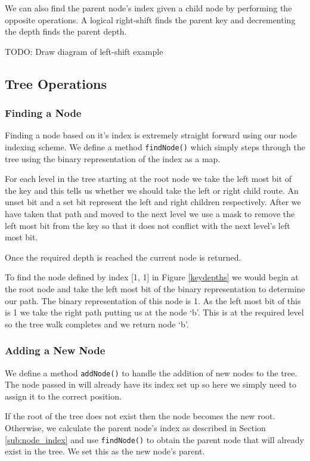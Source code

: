 \documentclass{report}
\begin{document}
We can also find the parent node's index given a child node by performing the opposite operations. A logical right-shift finds the parent key and decrementing the depth finds the parent depth.

TODO: Draw diagram of left-shift example

\subsection{Tree Operations}
\label{sub:tree_operations}

\subsubsection{Finding a Node}

Finding a node based on it's index is extremely straight forward using our node indexing scheme. We define a method {\tt findNode()} which simply steps through the tree using the binary representation of the index as a map.

For each level in the tree starting at the root node we take the left most bit of the key and this tells us whether we should take the left or right child route. An unset bit and a set bit represent the left and right children respectively. After we have taken that path and moved to the next level we use a mask to remove the left most bit from the key so that it does not conflict with the next level's left most bit.

Once the required depth is reached the current node is returned.

To find the node defined by index [1, 1] in Figure \ref{keydepths} we would begin at the root node and take the left most bit of the binary representation to determine our path. The binary representation of this node is 1. As the left most bit of this is 1 we take the right path putting us at the node `b'. This is at the required level so the tree walk completes and we return node `b'.

\subsubsection{Adding a New Node}

We define a method {\tt addNode()} to handle the addition of new nodes to the tree. The node passed in will already have its index set up so here we simply need to assign it to the correct position.

If the root of the tree does not exist then the node becomes the new root. Otherwise, we calculate the parent node's index as described in Section \ref{sub:node_index} and use {\tt findNode()} to obtain the parent node that will already exist in the tree. We set this as the new node's parent.
\end{document}
